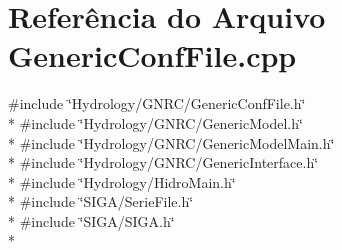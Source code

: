 \section{Referência do Arquivo Generic\+Conf\+File.\+cpp}
\label{_generic_conf_file_8cpp}
{\ttfamily \#include \char`\"{}Hydrology/\+G\+N\+R\+C/\+Generic\+Conf\+File.\+h\char`\"{}}\\*
{\ttfamily \#include \char`\"{}Hydrology/\+G\+N\+R\+C/\+Generic\+Model.\+h\char`\"{}}\\*
{\ttfamily \#include \char`\"{}Hydrology/\+G\+N\+R\+C/\+Generic\+Model\+Main.\+h\char`\"{}}\\*
{\ttfamily \#include \char`\"{}Hydrology/\+G\+N\+R\+C/\+Generic\+Interface.\+h\char`\"{}}\\*
{\ttfamily \#include \char`\"{}Hydrology/\+Hidro\+Main.\+h\char`\"{}}\\*
{\ttfamily \#include \char`\"{}S\+I\+G\+A/\+Serie\+File.\+h\char`\"{}}\\*
{\ttfamily \#include \char`\"{}S\+I\+G\+A/\+S\+I\+G\+A.\+h\char`\"{}}\\*
